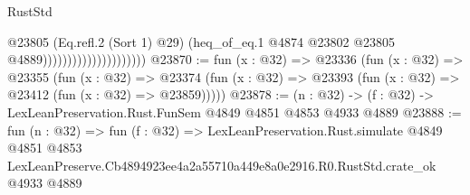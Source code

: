 \begin{lexlean}{RustStd}
\begin{coremodule}
                                            @23805
                                            (Eq.refl.{2} (Sort 1) @29)
                                            (heq_of_eq.{1}
                                              @4874
                                              @23802
                                              @23805
                                              @4889)))))))))))))))))))))
@23870 := fun (x : @32) =>
  @23336
    (fun (x : @32) =>
    @23355
      (fun (x : @32) =>
      @23374 (fun (x : @32) => @23393 (fun (x : @32) => @23412 (fun (x : @32) => @23859)))))
@23878 := (n : @32) -> (f : @32) -> LexLeanPreservation.Rust.FunSem @4849 @4851 @4853 @4933 @4889
@23888 := fun (n : @32) =>
  fun (f : @32) =>
  LexLeanPreservation.Rust.simulate
    @4849
    @4851
    @4853
    LexLeanPreserve.Cb4894923ee4a2a55710a449e8a0e2916.R0.RustStd.crate_ok
    @4933
    @4889
\end{coremodule}
\end{lexlean}
